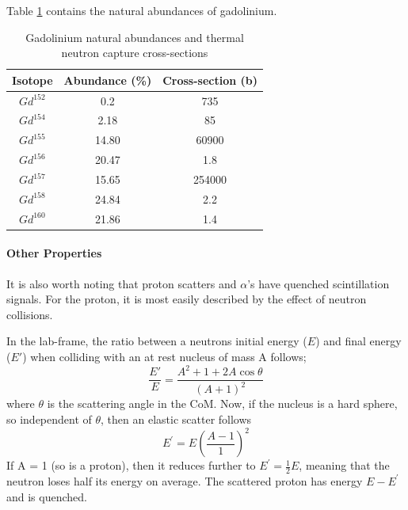 \par
Table \ref{tab:Gadolinium_abundances_and_crosssections} contains the natural abundances of gadolinium.

\begin{table}[!htbp]
    \centering
    \begin{tabular}{c | c | c}
    \hline
    {Isotope} & {Abundance (\%)} & {Cross-section (b)} \\ \hline
    $Gd^{152}$ & 0.2 & 735 \\
    $Gd^{154}$ & 2.18 & 85 \\
    $Gd^{155}$ & 14.80 & 60900 \\
    $Gd^{156}$ & 20.47 & 1.8 \\
    $Gd^{157}$ & 15.65 & 254000 \\
    $Gd^{158}$ & 24.84 & 2.2 \\
    $Gd^{160}$ & 21.86 & 1.4

    \end{tabular}
    \caption{Gadolinium natural abundances and thermal neutron capture cross-sections \cite{Gadolinium_abundances_and_crosssection_ref}}
    \label{tab:Gadolinium_abundances_and_crosssections}
\end{table} 

\paragraph{Other Properties}
It is also worth noting that proton scatters and $\alpha$'s have quenched scintillation signals.
For the proton, it is most easily described by the effect of neutron collisions.

\par
In the lab-frame, the ratio between a neutrons initial energy ($E$) and final energy ($E'$) when colliding with an at rest nucleus of mass A follows;
\begin{equation}
    \frac{E'}{E} = \frac{A^2 + 1 + 2A\cos{\theta}}{(A + 1)^2}
\end{equation}
where $\theta$ is the scattering angle in the CoM.
Now, if the nucleus is a hard sphere, so independent of $\theta$, then an elastic scatter follows
\begin{equation}
    E^{'} = E(\frac{A-1}{1})^{2}
\end{equation}
If A = 1 (so is a proton), then it reduces further to $E^{'} = \frac{1}{2}E$, meaning that the neutron loses half its energy on average.
The scattered proton has energy $E - E^{'}$ and is quenched.



